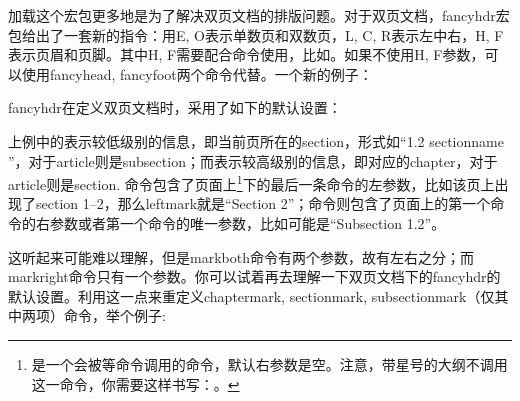 {加载这个宏包更多地是为了解决双页文档的排版问题。对于双页文档，fancyhdr宏包给出了一套新的指令：用E, O表示单数页和双数页，L, C, R表示左中右，H, F表示页眉和页脚。其中H, F需要配合\latexline{\\fancyhf}命令使用，比如。如果不使用H, F参数，可以使用fancyhead, fancyfoot两个命令代替。一个新的例子：
\begin{latex}{}
\fancyhead{} %
\fancyfoot{} %
  \fancyfoot[C]{\thepage}
\end{latex}

fancyhdr在定义双页文档时，采用了如下的默认设置：
\begin{latex}{}
\fancyhead[LE,RO]{\slshape \rightmark}
\fancyhead[LO,RE]{\slshape \leftmark}
\fancyfoot[C]{\thepage}
\end{latex}

上例中的\latexline{\\rightmark}表示较低级别的信息，即当前页所在的section，形式如“1.2 sectionname ”，对于article则是subsection；而\latexline{\\leftmark}表示较高级别的信息，即对应的chapter，对于article则是section. 命令\latexline{\\leftmark}包含了页面上\latexline{\\markboth}\footnote{\latexline{\\markboth}是一个会被\latexline{\\chapter}等命令调用的命令，默认右参数是空。注意，带星号的大纲不调用这一命令，你需要这样书写：。}下的最后一条命令的左参数，比如该页上出现了section 1--2，那么leftmark就是“Section 2”；命令\latexline{\\rightmark}则包含了页面上的第一个\latexline{\\markboth}命令的右参数或者第一个\latexline{\\markright}命令的唯一参数，比如可能是“Subsection 1.2”。

这听起来可能难以理解，但是markboth命令有两个参数，故有左右之分；而markright命令只有一个参数。你可以试着再去理解一下双页文档下的fancyhdr的默认设置。利用这一点来重定义chaptermark, sectionmark, subsectionmark（仅其中两项）命令，举个例子:
\begin{latex}{}
\renewcommand{\sectionmark}[1]{\markright{\thesection.\ #1}}
\renewcommand{\chaptermark}[1]{\markboth{\MakeUppercase{%
  \chaptername}\ \thechapter.\ #1}{}}
\end{latex}

}
